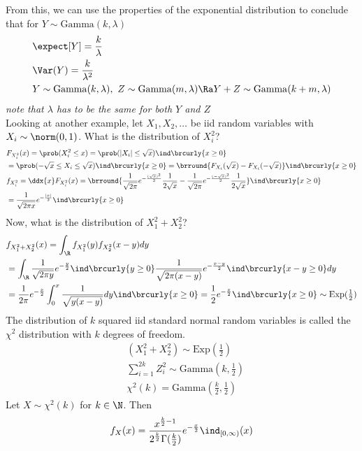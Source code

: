 From this, we can use the properties of the exponential distribution to conclude that for $Y\sim\mathrm{Gamma}(k,\lambda)$
\begin{align*}
    &\expect[Y]=\frac{k}{\lambda}\\
    &\Var(Y)=\frac{k}{\lambda^2}\\
    &Y\sim\mathrm{Gamma}(k,\lambda),\ Z\sim\mathrm{Gamma}(m,\lambda)\Ra Y+Z\sim\mathrm{Gamma}(k+m,\lambda)
\end{align*}
\textit{note that $\lambda$ has to be the same for both $Y$ and $Z$}\\
Looking at another example, let $X_1,X_2,\ldots$ be iid random variables with $X_i\sim\norm(0,1)$. What is the distribution of $X_i^2$?
\begin{align*}
    &F_{X_i^2}(x)=\prob(X_i^2\leq x)=\prob(|X_i|\leq\sqrt{x})\ind\brcurly{x\geq0}\\
    &=\prob(-\sqrt{x}\leq X_i\leq \sqrt{x})\ind\brcurly{x\geq0}=\brround{F_{X_i}(\sqrt{x})-F_{X_i}(-\sqrt{x})}\ind\brcurly{x\geq0}\\
    &f_{X_i^2}=\ddx{x}F_{X_i^2}(x)=\brround{\frac{1}{\sqrt{2\pi}}e^{-\frac{(\sqrt{x})^2}{2}}\frac{1}{2\sqrt{x}}-\frac{1}{\sqrt{2\pi}}e^{-\frac{(-\sqrt{x})^2}{2}}\frac{1}{2\sqrt{x}}}\ind\brcurly{x\geq0}\\
    &=\frac{1}{\sqrt{2\pi x}}e^{-\frac{|x|}{2}}\ind\brcurly{x\geq0}
\end{align*}
Now, what is the distribution of $X_1^2+X_2^2$?
\begin{align*}
    &f_{X_1^2+X_2^2}(x)=\int_\R f_{X_1^2}(y)f_{X_2^2}(x-y)dy\\
    &=\int_\R\frac{1}{\sqrt{2\pi y}}e^{-\frac{y}{2}}\ind\brcurly{y\geq0}\frac{1}{\sqrt{2\pi(x-y)}}e^{-\frac{x-y}{2}}\ind\brcurly{x-y\geq0}dy\\
    &=\frac{1}{2\pi}e^{-\frac{x}{2}}\int_0^x\frac{1}{\sqrt{y(x-y)}}dy\ind\brcurly{x\geq0}=\frac{1}{2}e^{-\frac{x}{2}}\ind\brcurly{x\geq0}\sim\mathrm{Exp}(\tfrac{1}{2})
\end{align*}
The distribution of $k$ squared iid standard normal random variables is called the $\chi^2$ distribution with $k$ degrees of freedom.
\begin{align*}
    &(X_1^2+X_2^2)\sim\mathrm{Exp}(\tfrac{1}{2})\\
    &\sum_{i=1}^{2k} Z_i^2\sim\mathrm{Gamma}(k,\tfrac{1}{2})\\
    &\chi^2(k)=\mathrm{Gamma}(\tfrac{k}{2},\tfrac{1}{2})
\end{align*}
Let $X\sim\chi^2(k)$ for $k\in\N$. Then
\[f_X(x)=\frac{x^{\frac{k}{2}-1}}{2^{\frac{k}{2}}\Gamma(\tfrac{k}{2})}e^{-\frac{x}{2}}\ind_{[0,\infty)}(x)\]
